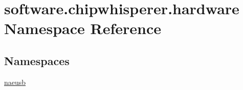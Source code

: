 \hypertarget{namespacesoftware_1_1chipwhisperer_1_1hardware}{}\section{software.\+chipwhisperer.\+hardware Namespace Reference}
\label{namespacesoftware_1_1chipwhisperer_1_1hardware}
\subsection*{Namespaces}
\begin{DoxyCompactItemize}
\item 
 \hyperlink{namespacesoftware_1_1chipwhisperer_1_1hardware_1_1naeusb}{naeusb}
\end{DoxyCompactItemize}
